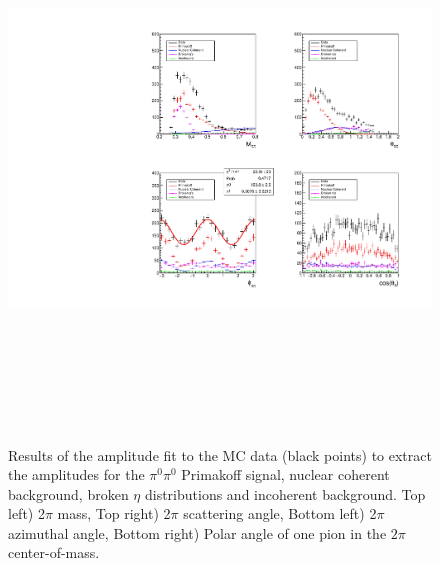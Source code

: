 \begin{figure}[tbp]
\begin{center}
\includegraphics[height=15cm,clip=true]{figures/twopi_primakoff_DSelect_test_File_100000_decomposition_PrimNCICeta.pdf}
\caption{Results of the amplitude fit to the MC data (black points) to extract the amplitudes for the $\pi^0\pi^0$ Primakoff signal, nuclear coherent background, broken $\eta$ distributions and incoherent background.
Top left) 2$\pi$ mass, Top right) 2$\pi$ scattering angle, Bottom left) 2$\pi$ azimuthal angle, 
Bottom right) Polar angle of one pion in the $2\pi$ center-of-mass.
\label{fig:decomposition_PrimNCICeta}}
\end{center} 
\end{figure}

